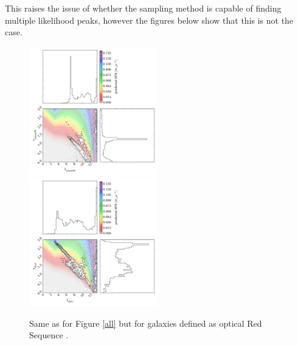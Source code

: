 \documentclass{mn2e}
\begin{document}
This raises the issue of whether the sampling method is capable of finding multiple likelihood peaks, however the figures below show that this is not the case. 

\begin{figure}
\includegraphics[width=0.4975\textwidth]{red_s_smooth.pdf}
\includegraphics[width=0.4975\textwidth]{red_s_disc.pdf}
\caption[8pt]{Same as for Figure \ref{all} but for galaxies defined as optical Red Sequence \cite{Baldry}.}
\label{red_s}
\end{figure}
\end{document}

